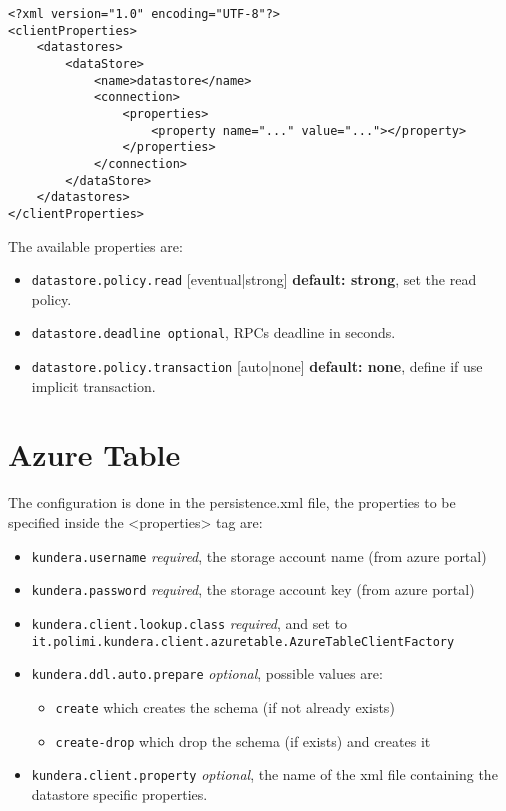 \begin{verbatim}
<?xml version="1.0" encoding="UTF-8"?>
<clientProperties>
    <datastores>
        <dataStore>
            <name>datastore</name>
            <connection>
                <properties>
                    <property name="..." value="..."></property>
                </properties>
            </connection>
        </dataStore>
    </datastores>
</clientProperties>
\end{verbatim}

\noindent The available properties are:
\begin{itemize}
\item \texttt{datastore.policy.read} [eventual|strong] \textbf{default: strong}, set the read policy.
\item \texttt{datastore.deadline optional}, RPCs deadline in seconds.
\item \texttt{datastore.policy.transaction} [auto|none] \textbf{default: none}, define if use implicit transaction.

\end{itemize}

\section{Azure Table}
\label{appendix:table-config}
The configuration is done in the persistence.xml file, the properties to be specified inside the <properties> tag are:
\begin{itemize}
\item \texttt{kundera.username} \textit{required}, the storage account name (from azure portal)
\item \texttt{kundera.password} \textit{required}, the storage account key (from azure portal)
\item \texttt{kundera.client.lookup.class} \textit{required}, and set to\\\texttt{it.polimi.kundera.client.azuretable.AzureTableClientFactory}
\item \texttt{kundera.ddl.auto.prepare} \textit{optional}, possible values are:
\begin{itemize}
\item \texttt{create} which creates the schema (if not already exists)
\item \texttt{create-drop} which drop the schema (if exists) and creates it
\end{itemize}
\item \texttt{kundera.client.property} \textit{optional}, the name of the xml file containing the datastore specific properties.
\end{itemize}

